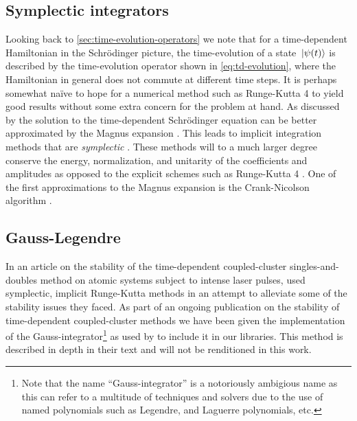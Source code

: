         \subsection{Symplectic integrators}
            \label{subsec:symplectic}
            Looking back to \autoref{sec:time-evolution-operators} we note that
            for a time-dependent Hamiltonian in the Schrödinger picture, the
            time-evolution of a state $\ket*{\psi(t)}$ is described by the
            time-evolution operator shown in \autoref{eq:td-evolution}, where
            the Hamiltonian in general does not commute at different time steps.
            It is perhaps somewhat naïve to hope for a numerical method such as
            Runge-Kutta 4 to yield good results without some extra concern for
            the problem at hand.
            As discussed by \citeauthor{joshua-magnus} \cite{joshua-magnus} the
            solution to the time-dependent Schrödinger equation can be better
            approximated by the Magnus expansion \cite{magnus-expansion}.
            This leads to implicit integration methods that are
            \emph{symplectic} \cite{joshua-magnus}.
            These methods will to a much larger degree conserve the energy,
            normalization, and unitarity of the coefficients and amplitudes as
            opposed to the explicit schemes such as Runge-Kutta 4
            \cite{joshua-magnus, pedersen2018symplectic}.
            One of the first approximations to the Magnus expansion is the
            Crank-Nicolson algorithm \cite{ullrich2011time, joshua-magnus}.


        \subsection{Gauss-Legendre}
            In an article on the stability of the time-dependent coupled-cluster
            singles-and-doubles method on atomic systems subject to intense
            laser pulses, \citeauthor{pedersen2018symplectic}
            \cite{pedersen2018symplectic} used symplectic, implicit Runge-Kutta
            methods in an attempt to alleviate some of the stability issues they
            faced.
            As part of an ongoing publication on the stability of time-dependent
            coupled-cluster methods \cite{oa-stability} we have been given the
            implementation of the Gauss-integrator\footnote{%
                Note that the name ``Gauss-integrator'' is a notoriously
                ambigious name as this can refer to a multitude of techniques
                and solvers due to the use of named polynomials such as
                Legendre, and Laguerre polynomials, etc.%
            } as used by \citeauthor{pedersen2018symplectic}
            \cite{pedersen2018symplectic} to include it in our libraries.
            This method is described in depth in their text
             \cite{pedersen2018symplectic} and
            will not be renditioned in this work.
